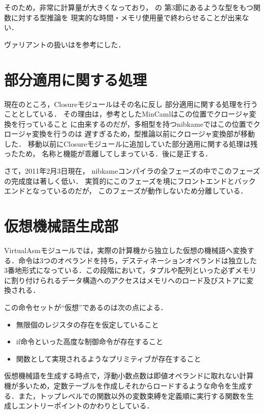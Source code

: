 \documentclass[a4paper,titlepage,disablejfam]{jsbook}
\begin{document}
そのため，非常に計算量が大きくなっており，
\cite{DBLP:journals/jfp/HengleinM94}の
第3節にあるような型をもつ関数に対する型推論を
現実的な時間・メモリ使用量で終わらせることが出来ない．

ヴァリアントの扱いは\cite{DBLP:conf/ctcs/Hagino87}を参考にした．


\section{部分適用に関する処理}\label{sc:impl-partial-application}
現在のところ，Closureモジュールはその名に反し
部分適用に関する処理を行うこととしている．
その理由は，参考としたMinCamlはこの位置でクロージャ変換を行っていること
に由来するのだが，多相型を持つnibkameではこの位置でクロージャ変換を行うのは
遅すぎるため，型推論以前にクロージャ変換部が移動した．
移動以前にClosureモジュールに追加していた部分適用に関する処理は残ったため，
名称と機能が乖離してしまっている．後に是正する．

さて，2011年2月3日現在，
nibkameコンパイラの全フェーズの中でこのフェーズの完成度は著しく低い．
実質的にこのフェーズを境にフロントエンドとバックエンドとなっているのだが，
このフェーズが動作しないため分離している．


\section{仮想機械語生成部}\label{sc:impl-virtualasm}
 VirtualAsmモジュールでは，実際の計算機から独立した仮想の機械語へ変換す
 る．命令は3つのオペランドを持ち，デスティネーションオペランドは独立した
 3番地形式になっている．この段階において，タプルや配列といった必ずメモリ
 に割り付けられるデータ構造へのアクセスはメモリへのロード及びストアに変
 換される．

 この命令セットが``仮想''であるのは次の点による．
 \begin{itemize}
  \item 無限個のレジスタの存在を仮定していること
  \item if命令といった高度な制御命令が存在すること
  \item 関数として実現されるようなプリミティブが存在すること
 \end{itemize}

 仮想機械語を生成する時点で，浮動小数点数は即値オペランドに取れない計算
 機が多いため，定数テーブルを作成しそれからロードするような命令を生成す
 る．また，トップレベルでの関数以外の変数束縛を定義順に実行する関数を生
 成しエントリーポイントのかわりとしている．
\end{document}
